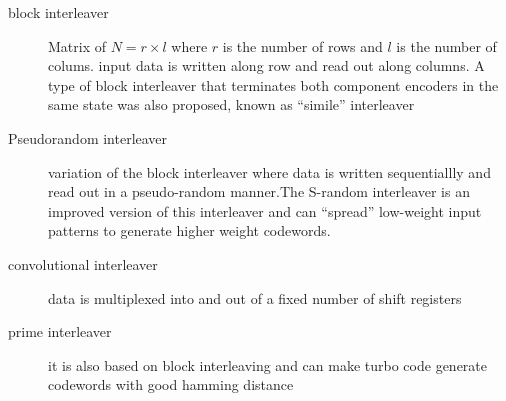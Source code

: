 \documentclass[11pt, oneside, dvipdfmx]{book}
\begin{document}
\begin{description}
\item[block interleaver] Matrix of $N=r \times l$ where $r$ is the number of rows and $l$ is the number of colums. input data is written along row and read out along columns. A type of block interleaver that terminates both component encoders in the same state was also proposed, known as ``simile'' interleaver

\item[Pseudorandom interleaver] variation of the block interleaver where data is written sequentiallly and read out in a pseudo-random manner.The S-random interleaver is an improved version of this interleaver and can ``spread'' low-weight input patterns to generate higher weight codewords.

\item[convolutional interleaver] data is multiplexed into and out of a fixed number of shift registers

\item[prime interleaver] it is also based on block interleaving and can make turbo code generate codewords with good hamming distance
\end{description}





\end{document}
